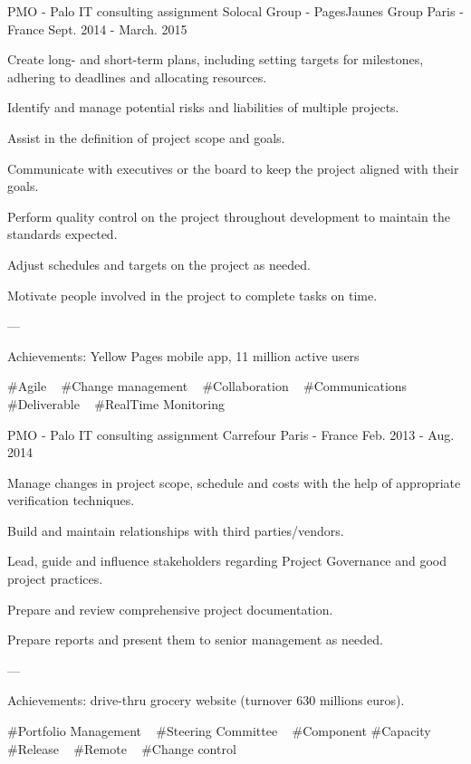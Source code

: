 \begin{cventries}
  \cventry
    {PMO - Palo IT consulting assignment} %
    {Solocal Group - PagesJaunes Group} %
    {Paris - France} %
    {Sept. 2014 - March. 2015} %
    {
      \begin{cvitems} %
        \item {Create long- and short-term plans, including setting targets for milestones, adhering to deadlines and allocating resources.}
        \item {Identify and manage potential risks and liabilities of multiple projects.}
        \item {Assist in the definition of project scope and goals.}
        \item {Communicate with executives or the board to keep the project aligned with their goals.}
        \item {Perform quality control on the project throughout development to maintain the standards expected.}
        \item {Adjust schedules and targets on the project as needed.}
        \item {Motivate people involved in the project to complete tasks on time.}
        \item {---}
        \item {Achievements: Yellow Pages mobile app, 11 million active users}
      \end{cvitems}
    }
    {
      \#Agile ~
      \#Change management ~
      \#Collaboration ~
      \#Communications ~
      \#Deliverable ~
      \#RealTime Monitoring ~
    }

  \cventry
    {PMO - Palo IT consulting assignment} %
    {Carrefour} %
    {Paris - France} %
    {Feb. 2013 - Aug. 2014} %
    {
      \begin{cvitems} %
        \item {Manage changes in project scope, schedule and costs with the help of appropriate verification techniques.}
        \item {Build and maintain relationships with third parties/vendors.}
        \item {Lead, guide and influence stakeholders regarding Project Governance and good project practices.}
        \item {Prepare and review comprehensive project documentation.}
        \item {Prepare reports and present them to senior management as needed.}
        \item {---}
        \item {Achievements: drive-thru grocery website (turnover 630 millions euros).}
      \end{cvitems}
    }
    {
      \#Portfolio Management ~
      \#Steering Committee ~
      \#Component
      \#Capacity
      \#Release ~
      \#Remote ~
      \#Change control ~
    }


\end{cventries}
